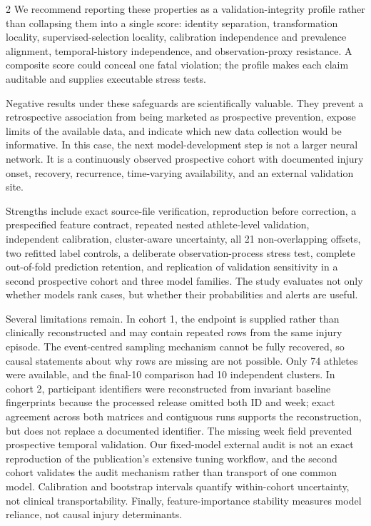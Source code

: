 \documentclass[11pt,a4paper]{article}
\begin{document}
\begin{multicols}{2}
We recommend reporting these properties as a validation-integrity profile rather than collapsing them into a single score: identity separation, transformation locality, supervised-selection locality, calibration independence and prevalence alignment, temporal-history independence, and observation-proxy resistance. A composite score could conceal one fatal violation; the profile makes each claim auditable and supplies executable stress tests.

Negative results under these safeguards are scientifically valuable. They prevent a retrospective association from being marketed as prospective prevention, expose limits of the available data, and indicate which new data collection would be informative. In this case, the next model-development step is not a larger neural network. It is a continuously observed prospective cohort with documented injury onset, recovery, recurrence, time-varying availability, and an external validation site.

Strengths include exact source-file verification, reproduction before correction, a prespecified feature contract, repeated nested athlete-level validation, independent calibration, cluster-aware uncertainty, all 21 non-overlapping offsets, two refitted label controls, a deliberate observation-process stress test, complete out-of-fold prediction retention, and replication of validation sensitivity in a second prospective cohort and three model families. The study evaluates not only whether models rank cases, but whether their probabilities and alerts are useful.

Several limitations remain. In cohort 1, the endpoint is supplied rather than clinically reconstructed and may contain repeated rows from the same injury episode. The event-centred sampling mechanism cannot be fully recovered, so causal statements about why rows are missing are not possible. Only 74 athletes were available, and the final-10 comparison had 10 independent clusters. In cohort 2, participant identifiers were reconstructed from invariant baseline fingerprints because the processed release omitted both ID and week; exact agreement across both matrices and contiguous runs supports the reconstruction, but does not replace a documented identifier. The missing week field prevented prospective temporal validation. Our fixed-model external audit is not an exact reproduction of the publication's extensive tuning workflow, and the second cohort validates the audit mechanism rather than transport of one common model. Calibration and bootstrap intervals quantify within-cohort uncertainty, not clinical transportability. Finally, feature-importance stability measures model reliance, not causal injury determinants.

\end{multicols} 
\end{document}
